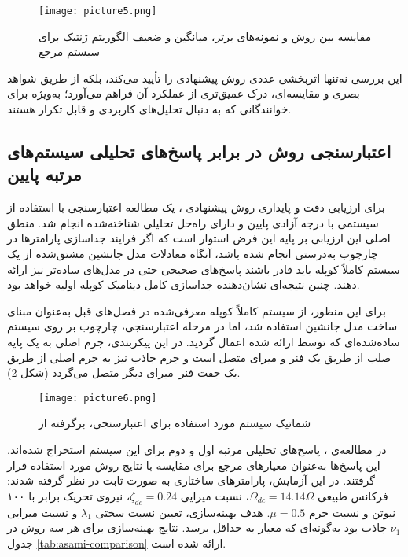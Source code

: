 \begin{figure}[H]
    \centering
    \texttt{[image: picture5.png]}
    \caption{مقایسه  بین روش  و نمونه‌های برتر، میانگین و ضعیف الگوریتم ژنتیک برای سیستم مرجع}
    \label{fig:frf-dps-vs-ga}
\end{figure}

این بررسی نه‌تنها اثربخشی عددی روش پیشنهادی را تأیید می‌کند، بلکه از طریق شواهد بصری و مقایسه‌ای، درک عمیق‌تری از عملکرد آن فراهم می‌آورد؛ به‌ویژه برای خوانندگانی که به دنبال تحلیل‌های کاربردی و قابل تکرار هستند.



\subsection{اعتبارسنجی روش  در برابر پاسخ‌های تحلیلی سیستم‌های مرتبه پایین}

برای ارزیابی دقت و پایداری روش پیشنهادی ، یک مطالعه اعتبارسنجی با استفاده از سیستمی با درجه آزادی پایین و دارای راه‌حل تحلیلی شناخته‌شده انجام شد. منطق اصلی این ارزیابی بر پایه این فرض استوار است که اگر فرایند جداسازی پارامترها در چارچوب  به‌درستی انجام شده باشد، آنگاه معادلات مدل جانشین مشتق‌شده از یک سیستم کاملاً کوپله باید قادر باشند پاسخ‌های صحیحی حتی در مدل‌های ساده‌تر نیز ارائه دهند. چنین نتیجه‌ای نشان‌دهنده جداسازی کامل دینامیک کوپله اولیه خواهد بود.

برای این منظور، از سیستم  کاملاً کوپله معرفی‌شده در فصل‌های قبل به‌عنوان مبنای ساخت مدل جانشین استفاده شد، اما در مرحله اعتبارسنجی، چارچوب  بر روی سیستم ساده‌شده‌ای که توسط  \cite{asami2002analytical} ارائه شده اعمال گردید. در این پیکربندی، جرم اصلی به یک پایه صلب از طریق یک فنر و میرای متصل است و جرم جاذب نیز به جرم اصلی از طریق یک جفت فنر–میرای دیگر متصل می‌گردد (شکل \ref{fig:asami-validation-diagram}).

\begin{figure}[h]
\centering
\texttt{[image: picture6.png]}
\caption{شماتیک سیستم مورد استفاده برای اعتبارسنجی، برگرفته از  \cite{asami2002analytical}}
\label{fig:asami-validation-diagram}
\end{figure}

در مطالعه‌ی ، پاسخ‌های تحلیلی مرتبه اول و دوم برای این سیستم استخراج شده‌اند. این پاسخ‌ها به‌عنوان معیارهای مرجع برای مقایسه با نتایج روش  مورد استفاده قرار گرفتند. در این آزمایش، پارامترهای ساختاری به صورت ثابت در نظر گرفته شدند: فرکانس طبیعی $\Omega_{dc} = 14.14 \Omega$، نسبت میرایی $\zeta_{dc} = 0.24$، نیروی تحریک برابر با ۱۰۰ نیوتن و نسبت جرم $\mu = 0.5$. هدف بهینه‌سازی، تعیین نسبت سختی $\lambda_1$ و نسبت میرایی $\nu_1$ جاذب بود به‌گونه‌ای که معیار  به حداقل برسد. نتایج بهینه‌سازی برای هر سه روش در جدول \ref{tab:asami-comparison} ارائه شده است.

